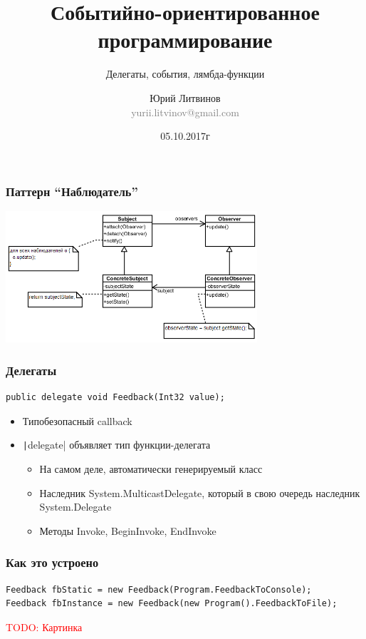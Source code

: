\documentclass[xetex,mathserif,serif]{beamer}
\title{Событийно-ориентированное программирование}
\subtitle{Делегаты, события, лямбда-функции}
\author[Юрий Литвинов]{Юрий Литвинов\\\small{\textcolor{gray}{yurii.litvinov@gmail.com}}}
\date{05.10.2017г}
\newcommand{\todo}[1] {
	\begin{center}\textcolor{red}{TODO: #1}\end{center}
}
\begin{document}
	\frame{\titlepage}

	\begin{frame}
		\frametitle{Паттерн ``Наблюдатель''}
		\begin{center}
			\includegraphics[width=0.7\textwidth]{observer.png}
		\end{center}
	\end{frame}

	\begin{frame}[fragile]
		\frametitle{Делегаты}
		\begin{verbatim}
public delegate void Feedback(Int32 value);
		\end{verbatim}
		\begin{itemize}
			\item Типобезопасный callback
			\item \texttt|delegate| объявляет тип функции-делегата
			\begin{itemize}
				\item На самом деле, автоматически генерируемый класс
				\item Наследник System.MulticastDelegate, который в свою очередь наследник System.Delegate
				\item Методы Invoke, BeginInvoke, EndInvoke
			\end{itemize}
		\end{itemize}
	\end{frame}

	\begin{frame}[fragile]
		\frametitle{Как это устроено}
		\begin{verbatim}
Feedback fbStatic = new Feedback(Program.FeedbackToConsole);
Feedback fbInstance = new Feedback(new Program().FeedbackToFile);
		\end{verbatim}
		\todo{Картинка}
	\end{frame}
\end{document}
